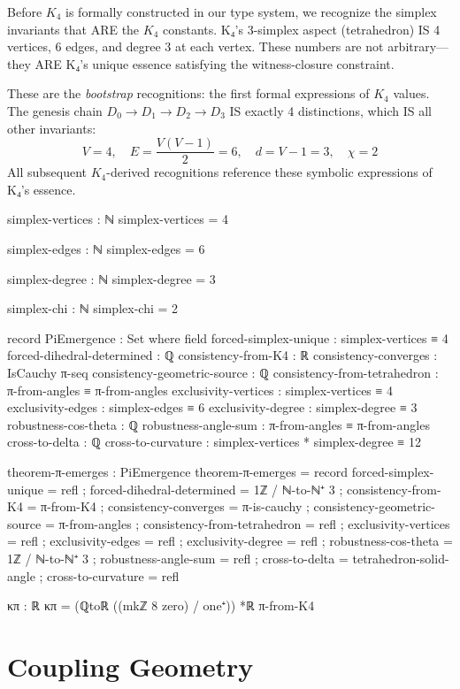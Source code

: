\documentclass[11pt,a4paper]{book}
\begin{document}
Before $K_4$ is formally constructed in our type system, we recognize the simplex invariants 
that ARE the $K_4$ constants. K₄'s 3-simplex aspect (tetrahedron) IS 4 vertices, 6 edges, and 
degree 3 at each vertex. These numbers are not arbitrary—they ARE K₄'s unique essence 
satisfying the witness-closure constraint.

These are the \emph{bootstrap} recognitions: the first formal expressions of $K_4$ values.
The genesis chain $D_0 \to D_1 \to D_2 \to D_3$ IS exactly 4 distinctions, which IS all 
other invariants:
\[
V = 4, \quad E = \frac{V(V-1)}{2} = 6, \quad d = V-1 = 3, \quad \chi = 2
\]
All subsequent $K_4$-derived recognitions reference these symbolic expressions of K₄'s essence.

\begin{code}
simplex-vertices : ℕ
simplex-vertices = 4

simplex-edges : ℕ
simplex-edges = 6

simplex-degree : ℕ
simplex-degree = 3

simplex-chi : ℕ
simplex-chi = 2

record PiEmergence : Set where
  field
    forced-simplex-unique      : simplex-vertices ≡ 4
    forced-dihedral-determined : ℚ
    consistency-from-K4        : ℝ
    consistency-converges      : IsCauchy π-seq
    consistency-geometric-source : ℚ
    consistency-from-tetrahedron : π-from-angles ≡ π-from-angles
    exclusivity-vertices : simplex-vertices ≡ 4
    exclusivity-edges    : simplex-edges ≡ 6
    exclusivity-degree   : simplex-degree ≡ 3
    robustness-cos-theta : ℚ
    robustness-angle-sum : π-from-angles ≡ π-from-angles
    cross-to-delta       : ℚ
    cross-to-curvature   : simplex-vertices * simplex-degree ≡ 12

theorem-π-emerges : PiEmergence
theorem-π-emerges = record
  { forced-simplex-unique = refl
  ; forced-dihedral-determined = 1ℤ / ℕ-to-ℕ⁺ 3
  ; consistency-from-K4 = π-from-K4
  ; consistency-converges = π-is-cauchy
  ; consistency-geometric-source = π-from-angles
  ; consistency-from-tetrahedron = refl
  ; exclusivity-vertices = refl
  ; exclusivity-edges = refl
  ; exclusivity-degree = refl
  ; robustness-cos-theta = 1ℤ / ℕ-to-ℕ⁺ 3
  ; robustness-angle-sum = refl
  ; cross-to-delta = tetrahedron-solid-angle
  ; cross-to-curvature = refl
  }

κπ : ℝ
κπ = (ℚtoℝ ((mkℤ 8 zero) / one⁺)) *ℝ π-from-K4
\end{code}

\chapter{Coupling Geometry}
\end{document}
